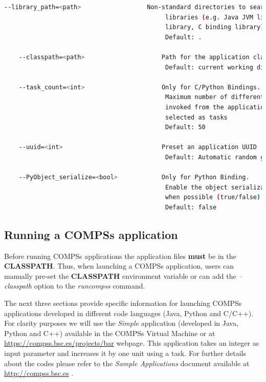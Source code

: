 \begin{lstlisting}[language=bash]
    --library_path=<path>                  Non-standard directories to search for 
                                            libraries (e.g. Java JVM library, Python 
                                            library, C binding library) 
                                            Default: .
                                            
    --classpath=<path>                     Path for the application classes / modules
                                            Default: current working directory.
                                            
    --task_count=<int>                     Only for C/Python Bindings. 
                                            Maximum number of different functions/methods
                                            invoked from the application that have been 
                                            selected as tasks
                                            Default: 50
                                            
    --uuid=<int>                           Preset an application UUID
                                            Default: Automatic random generation
                                            
    --PyObject_serialize=<bool>            Only for Python Binding. 
                                            Enable the object serialization to string 
                                            when possible (true/false).
                                            Default: false

\end{lstlisting}

\subsection{Running a COMPSs application}
\label{subsec:running_compss}
Before running COMPSs applications the application files \textbf{must} be in the \textbf{CLASSPATH}.
Thus, when launching a COMPSs application, users can manually pre-set the \textbf{CLASSPATH} environment variable
or can add the \textit{--classpath} option to the \textit{runcompss} command.

The next three sections provide specific information for launching COMPSs applications developed in different code languages (Java, Python and 
C/C++). For clarity purposes we will use the \textit{Simple} application (developed in Java, Python and C++) available in the COMPSs
Virtual Machine or at \url{https://compss.bsc.es/projects/bar} webpage. This application takes an integer as input
parameter and increases it by one unit using a task. For further details about the codes please refer to the \textit{Sample 
Applications} document available at \url{http://compss.bsc.es} .

